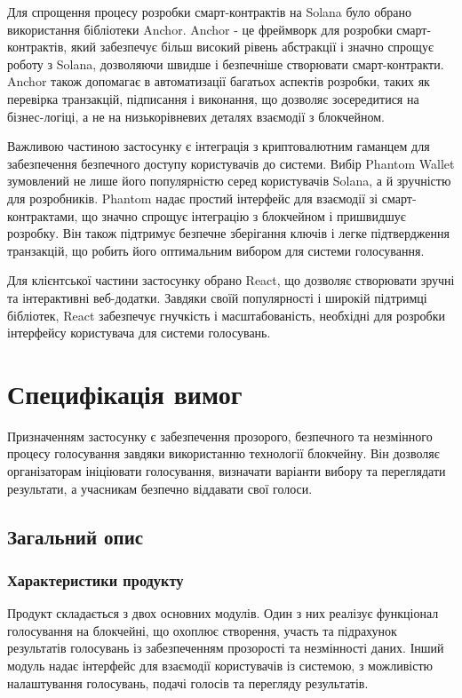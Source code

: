 \documentclass[14pt]{extreport}
\begin{document}
  Для спрощення процесу розробки смарт-контрактів на Solana було обрано використання бібліотеки Anchor. Anchor - це фреймворк для розробки смарт-контрактів, який забезпечує більш високий рівень абстракції і значно спрощує роботу з Solana, дозволяючи швидше і безпечніше створювати смарт-контракти. Anchor також допомагає в автоматизації багатьох аспектів розробки, таких як перевірка транзакцій, підписання і виконання, що дозволяє зосередитися на бізнес-логіці, а не на низькорівневих деталях взаємодії з блокчейном.

  Важливою частиною застосунку є інтеграція з криптовалютним гаманцем для забезпечення безпечного доступу користувачів до системи. Вибір Phantom Wallet зумовлений не лише його популярністю серед користувачів Solana, а й зручністю для розробників. Phantom надає простий інтерфейс для взаємодії зі смарт-контрактами, що значно спрощує інтеграцію з блокчейном і пришвидшує розробку. Він також підтримує безпечне зберігання ключів і легке підтвердження транзакцій, що робить його оптимальним вибором для системи голосування.

  Для клієнтської частини застосунку обрано React, що дозволяє створювати зручні та інтерактивні веб-додатки. Завдяки своїй популярності і широкій підтримці бібліотек, React забезпечує гнучкість і масштабованість, необхідні для розробки інтерфейсу користувача для системи голосувань.
  
  \section{Специфікація вимог}
  
  Призначенням застосунку є забезпечення прозорого, безпечного та незмінного процесу голосування завдяки використанню технології блокчейну. Він дозволяє організаторам ініціювати голосування, визначати варіанти вибору та переглядати результати, а учасникам безпечно віддавати свої голоси.
  
  
  \subsection{Загальний опис}
  \subsubsection{Характеристики продукту}  
  Продукт складається з двох основних модулів. Один з них реалізує функціонал голосування на блокчейні, що охоплює створення, участь та підрахунок результатів голосувань із забезпеченням прозорості та незмінності даних. Інший модуль надає інтерфейс для взаємодії користувачів із системою, з можливістю налаштування голосувань, подачі голосів та перегляду результатів.
  
\end{document}
